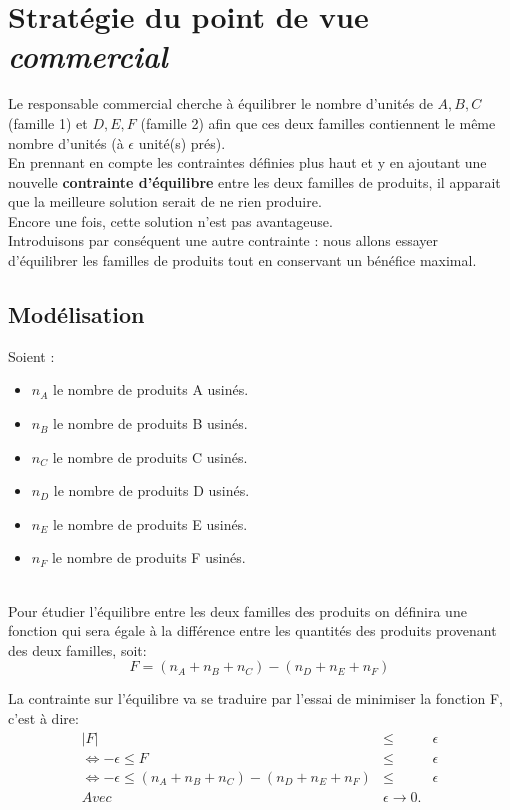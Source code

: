 \section{Stratégie du point de vue \textsl{commercial}}
\label{sec:monocrit}
Le responsable commercial cherche à équilibrer le nombre
d'unités de ${A, B, C}$ (famille 1) et ${D, E, F}$ (famille 2) afin que ces deux
familles contiennent le même nombre d'unités (à $\epsilon$ unité(s) prés).
~\\
En prennant en compte les contraintes définies plus haut et y en ajoutant une nouvelle
\textbf{contrainte d'équilibre} entre les deux familles de produits, il apparait que
la meilleure solution serait de ne rien produire.\\
Encore une fois, cette solution n'est pas avantageuse.\\
Introduisons par conséquent une autre contrainte : nous allons 
essayer d'équilibrer les familles de produits tout en conservant un bénéfice
maximal. 

\subsection{Modélisation}
Soient :
\begin{itemize}
	\item $n_A$ le nombre de produits A usinés. 
	\item $n_B$ le nombre de produits B usinés. 
	\item $n_C$ le nombre de produits C usinés. 
	\item $n_D$ le nombre de produits D usinés. 
	\item $n_E$ le nombre de produits E usinés. 
	\item $n_F$ le nombre de produits F usinés. 
\end{itemize}
~\\
Pour étudier l'équilibre entre les deux familles des produits on définira une
fonction qui sera égale à la différence entre les quantités des produits
provenant des deux familles, soit: 
\begin{displaymath}
	F = (n_A+n_B+n_C)-(n_D+n_E+n_F)
\end{displaymath}

La contrainte sur l'équilibre va se traduire par l'essai de minimiser la
fonction F, c'est à dire:
\begin{eqnarray*}
	|F| &\leq& \epsilon\\
	\Leftrightarrow -\epsilon \leq F &\leq& \epsilon\\
	\Leftrightarrow -\epsilon \leq (n_A+n_B+n_C)-(n_D+n_E+n_F)
	&\leq& \epsilon\\
	Avec& \epsilon \rightarrow 0.\\
\end{eqnarray*} 

